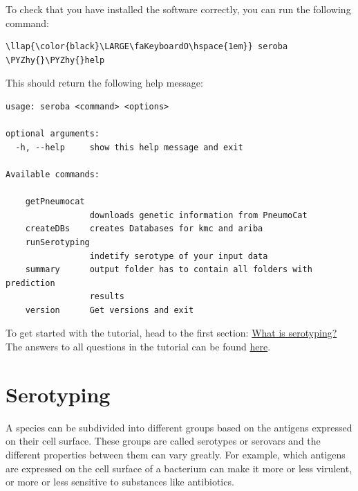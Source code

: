 \documentclass[11pt]{article}
\def\PYZhy{\char`\-}
\begin{document}
To check that you have installed the software correctly, you can run the
following command:

\begin{terminalinput}
\begin{Verbatim}[commandchars=\\\{\}]
\llap{\color{black}\LARGE\faKeyboardO\hspace{1em}} seroba \PYZhy{}\PYZhy{}help
\end{Verbatim}
\end{terminalinput}

    This should return the following help message:


\newpage



\begin{verbatim}
usage: seroba <command> <options>

optional arguments:
  -h, --help     show this help message and exit

Available commands:

    getPneumocat
                 downloads genetic information from PneumoCat
    createDBs    creates Databases for kmc and ariba
    runSerotyping
                 indetify serotype of your input data
    summary      output folder has to contain all folders with prediction
                 results
    version      Get versions and exit
\end{verbatim}

To get started with the tutorial, head to the first section:
\href{serotyping.ipynb}{What is serotyping?} The answers to all
questions in the tutorial can be found \href{Answers.ipynb}{here}.





\newpage






    \hypertarget{serotyping}{%
\section{Serotyping}\label{serotyping}}

    A species can be subdivided into different groups based on the antigens
expressed on their cell surface. These groups are called serotypes or
serovars and the different properties between them can vary greatly. For
example, which antigens are expressed on the cell surface of a bacterium
can make it more or less virulent, or more or less sensitive to
substances like antibiotics.
\end{document}
